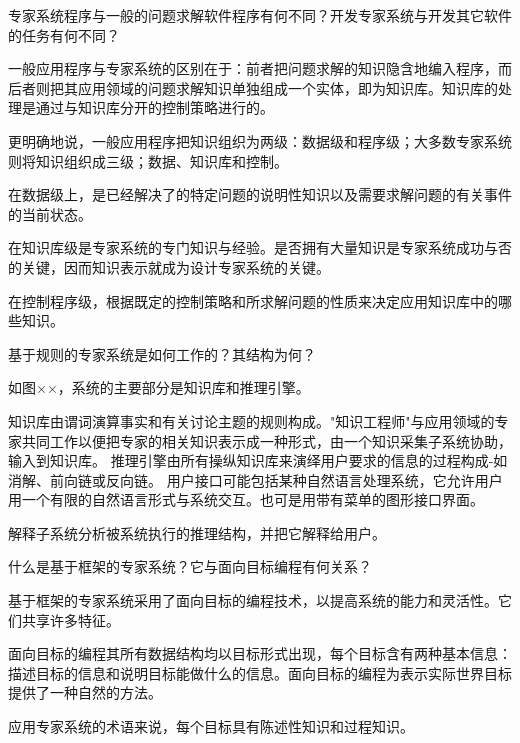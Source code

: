 \begin{question}
专家系统程序与一般的问题求解软件程序有何不同？开发专家系统与开发其它软件的任务有何不同？
\end{question}
\begin{solution}
一般应用程序与专家系统的区别在于：前者把问题求解的知识隐含地编入程序，而后者则把其应用领域的问题求解知识单独组成一个实体，即为知识库。知识库的处理是通过与知识库分开的控制策略进行的。\par
更明确地说，一般应用程序把知识组织为两级：数据级和程序级；大多数专家系统则将知识组织成三级；数据、知识库和控制。\par
在数据级上，是已经解决了的特定问题的说明性知识以及需要求解问题的有关事件的当前状态。\par
在知识库级是专家系统的专门知识与经验。是否拥有大量知识是专家系统成功与否的关键，因而知识表示就成为设计专家系统的关键。\par
在控制程序级，根据既定的控制策略和所求解问题的性质来决定应用知识库中的哪些知识。
\end{solution}

\begin{question}
基于规则的专家系统是如何工作的？其结构为何？
\end{question}
\begin{solution}
如图××，系统的主要部分是知识库和推理引擎。\par
知识库由谓词演算事实和有关讨论主题的规则构成。"知识工程师"与应用领域的专家共同工作以便把专家的相关知识表示成一种形式，由一个知识采集子系统协助，输入到知识库。 推理引擎由所有操纵知识库来演绎用户要求的信息的过程构成-如消解、前向链或反向链。 用户接口可能包括某种自然语言处理系统，它允许用户用一个有限的自然语言形式与系统交互。也可是用带有菜单的图形接口界面。\par
解释子系统分析被系统执行的推理结构，并把它解释给用户。
\end{solution}

\begin{question}
什么是基于框架的专家系统？它与面向目标编程有何关系？
\end{question}
\begin{solution}
基于框架的专家系统采用了面向目标的编程技术，以提高系统的能力和灵活性。它们共享许多特征。\par
面向目标的编程其所有数据结构均以目标形式出现，每个目标含有两种基本信息：描述目标的信息和说明目标能做什么的信息。面向目标的编程为表示实际世界目标提供了一种自然的方法。\par
应用专家系统的术语来说，每个目标具有陈述性知识和过程知识。 
\end{solution}

